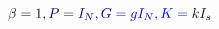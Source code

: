 \documentclass[12pt]{article}
\begin{document}
\makeatletter
\renewcommand*{\@textcolor}[3]{%
  \protect\leavevmode
  \begingroup
    \color#1{#2}#3%
  \endgroup
}
\makeatother
\begin{displaymath}
\mathcolor[RGB]{0,0,15}{\beta} \mathcolor[RGB]{0,0,30}{=} \mathcolor[RGB]{0,0,45}{1} \mathcolor[RGB]{0,0,60}{,} \mathcolor[RGB]{0,0,75}{P} \mathcolor[RGB]{0,0,90}{=} \mathcolor[RGB]{0,0,105}{I} _ { \mathcolor[RGB]{0,0,120}{N} } \mathcolor[RGB]{0,0,135}{,} \mathcolor[RGB]{0,0,150}{G} \mathcolor[RGB]{0,0,165}{=} \mathcolor[RGB]{0,0,180}{g} \mathcolor[RGB]{0,0,195}{I} _ { \mathcolor[RGB]{0,0,210}{N} } \mathcolor[RGB]{0,0,225}{,} \mathcolor[RGB]{0,0,240}{K} \mathcolor[RGB]{0,0,255}{=} \mathcolor[RGB]{0,15,0}{k} \mathcolor[RGB]{0,15,15}{I} _ { \mathcolor[RGB]{0,15,30}{s} }
\end{displaymath}
\end{document}
